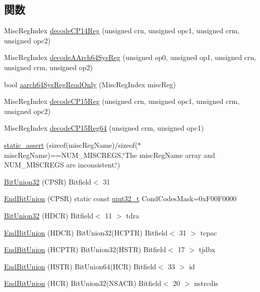\subsection*{関数}
\begin{DoxyCompactItemize}
\item 
MiscRegIndex \hyperlink{namespaceArmISA_a1ba78f25d3c295dcaf5f0303b884d6ca}{decodeCP14Reg} (unsigned crn, unsigned opc1, unsigned crm, unsigned opc2)
\item 
MiscRegIndex \hyperlink{namespaceArmISA_ae906d211cdcad8482b82e1bbe7dc9700}{decodeAArch64SysReg} (unsigned op0, unsigned op1, unsigned crn, unsigned crm, unsigned op2)
\item 
bool \hyperlink{namespaceArmISA_a76c990bcb3826d0f4322c96b8be3370d}{aarch64SysRegReadOnly} (MiscRegIndex miscReg)
\item 
MiscRegIndex \hyperlink{namespaceArmISA_a8b643abe8290a2784ae985b22abfd308}{decodeCP15Reg} (unsigned crn, unsigned opc1, unsigned crm, unsigned opc2)
\item 
MiscRegIndex \hyperlink{namespaceArmISA_a6208758bcb2a5c04409fdd52548d91f5}{decodeCP15Reg64} (unsigned crm, unsigned opc1)
\item 
\hyperlink{namespaceArmISA_a7689d3de2443015338a63378c7aa6182}{static\_\-assert} (sizeof(miscRegName)/sizeof($\ast$miscRegName)==NUM\_\-MISCREGS,\char`\"{}The miscRegName array and NUM\_\-MISCREGS are inconsistent.\char`\"{})
\item 
\hyperlink{namespaceArmISA_a34b7283592d851f9ab2edabde0dd27ea}{BitUnion32} (CPSR) Bitfield$<$ 31
\item 
\hyperlink{namespaceArmISA_abc95554b803bcebcaafe59415fcb5225}{EndBitUnion} (CPSR) static const \hyperlink{Type_8hh_a435d1572bf3f880d55459d9805097f62}{uint32\_\-t} CondCodesMask=0xF00F0000
\item 
\hyperlink{namespaceArmISA_a21dd0b0eb60d2184ca00a5431505b9d7}{BitUnion32} (HDCR) Bitfield$<$ 11 $>$ tdra
\item 
\hyperlink{namespaceArmISA_a9ddcb65e66c8d8f74321fff84d2314c4}{EndBitUnion} (HDCR) BitUnion32(HCPTR) Bitfield$<$ 31 $>$ tcpac
\item 
\hyperlink{namespaceArmISA_a96da1c484eecc0f8ef22c940148cc969}{EndBitUnion} (HCPTR) BitUnion32(HSTR) Bitfield$<$ 17 $>$ tjdbx
\item 
\hyperlink{namespaceArmISA_ac3f0dd77c011d06ec72a256094d41f2d}{EndBitUnion} (HSTR) BitUnion64(HCR) Bitfield$<$ 33 $>$ id
\item 
\hyperlink{namespaceArmISA_a8b8adc627a3a2c30d582bb2e5619e65b}{EndBitUnion} (HCR) BitUnion32(NSACR) Bitfield$<$ 20 $>$ nstrcdis

\end{DoxyCompactItemize}
